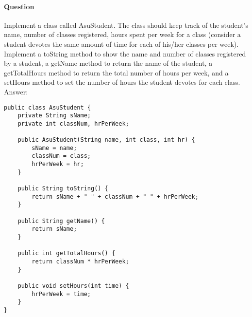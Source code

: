 \documentclass{article}
\begin{document}
\addtocounter{question_num}{1}
\paragraph{Question }
Implement a class called AsuStudent. The class should keep track of the student's name, number of classes registered, hours spent per week for a class (consider a student devotes the same amount of time for each of his/her classes per week). Implement a toString method to show the name and number of classes registered by a student, a getName method to return the name of the student, a getTotalHours method to return the total number of hours per week, and a setHours method to set the number of hours the student devotes for each class.
 {\color{red} \newline Answer:}
\begin{lstlisting}
public class AsuStudent {
	private String sName;
	private int classNum, hrPerWeek;
	
	public AsuStudent(String name, int class, int hr) {
		sName = name;
		classNum = class;
		hrPerWeek = hr;
	}

	public String toString() {
		return sName + " " + classNum + " " + hrPerWeek;
	}

	public String getName() {
		return sName;
	}

	public int getTotalHours() {
		return classNum * hrPerWeek;
	}

	public void setHours(int time) {
		hrPerWeek = time;
	}
}
\end{lstlisting}
\end{document}
